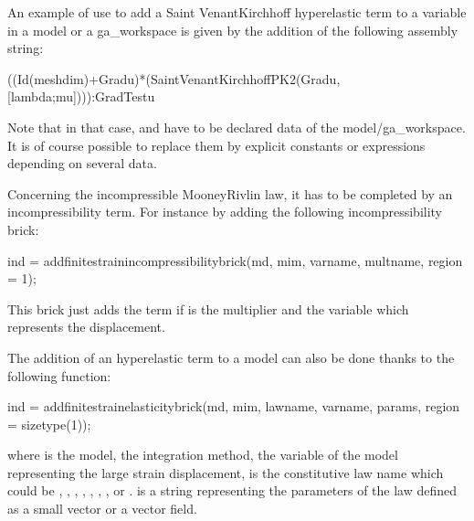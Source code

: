 \documentclass[a4paper,11pt,english]{sphinxmanual}
\begin{document}
An example of use to add a Saint Venant\sphinxhyphen{}Kirchhoff hyperelastic term to a variable  in a model or a ga\_workspace is given by the addition of the following assembly string:

\begin{sphinxVerbatim}[commandchars=\\\{\}]
\PYGZdq{}((Id(meshdim)+Grad\PYGZus{}u)*(Saint\PYGZus{}Venant\PYGZus{}Kirchhoff\PYGZus{}PK2(Grad\PYGZus{}u,[lambda;mu]))):Grad\PYGZus{}Test\PYGZus{}u\PYGZdq{}
\end{sphinxVerbatim}

Note that in that case,  and  have to be declared data of the model/ga\_workspace. It is of course possible to replace them by explicit constants or expressions depending on several data.

Concerning the incompressible Mooney\sphinxhyphen{}Rivlin law, it has to be completed by an incompressibility term. For instance by adding the following incompressibility brick:

\begin{sphinxVerbatim}[commandchars=\\\{\}]
ind = add\PYGZus{}finite\PYGZus{}strain\PYGZus{}incompressibility\PYGZus{}brick(md, mim, varname, multname, region = \PYGZhy{}1);
\end{sphinxVerbatim}

This brick just adds the term  if  is the multiplier and  the variable which represents the displacement.

The addition of an hyperelastic term to a model can also be done thanks to the following function:

\begin{sphinxVerbatim}[commandchars=\\\{\}]
ind = add\PYGZus{}finite\PYGZus{}strain\PYGZus{}elasticity\PYGZus{}brick(md, mim, lawname, varname, params,
                                         region = size\PYGZus{}type(\PYGZhy{}1));
\end{sphinxVerbatim}

where  is the model,  the integration method,  the variable of the model representing the large strain displacement,  is the constitutive law name which could be , , , , , , ,  or .  is a string representing the parameters of the law defined as a small vector or a vector field.
\end{document}
